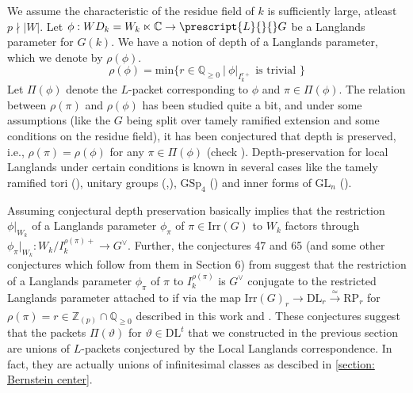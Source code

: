 \documentclass[11 pt]{article}
\numberwithin{equation}{subsection}
\theoremstyle{definition}
\theoremstyle{remark}
\theoremstyle{conjecture}
\newcommand{\Irr}{\mathrm{Irr}}
\newcommand{\DL}{\mathrm{DL}}
\newcommand{\RP}{\mathrm{RP}}
\newcommand{\GL}{\mathrm{GL}}
\newcommand{\Z}{\mathbb Z}
\newcommand{\Q}{\mathbb Q}
\newcommand{\C}{\mathbb C}
\begin{document}
We assume the characteristic of the residue field of $k$ is sufficiently large, atleast $p \nmid |W|$. Let $\phi: WD_k=W_k\ltimes\C\rightarrow \prescript{L}{}{}G$ be a Langlands parameter for $G(k)$. We have a notion of depth of a Langlands parameter, which we denote by $\rho(\phi)$. 
\begin{equation*}
    \rho(\phi)=\text{min}\{ r \in \Q_{\geq 0}\:|\: \phi|_{I_k^{r+}}\text{ is trivial }\}
\end{equation*}
Let $\Pi(\phi)$ denote the $L$-packet corresponding to $\phi$ and $\pi \in \Pi(\phi)$. The relation between $\rho(\pi)$ and $\rho(\phi)$ has been studied quite a bit, and under some assumptions (like the $G$ being split over tamely ramified extension and some conditions on the residue field), it has been conjectured that depth is preserved, i.e., $\rho(\pi)=\rho(\phi)$ for any $\pi \in \Pi(\phi)$ (check \cite[Conjecture 52]{chendebackertsai}). Depth-preservation for local Langlands under certain conditions is known in several cases like the tamely ramified tori (\cite[Section 7.10]{Yutori}), unitary groups (\cite{oi2023depthquasispliclassical},\cite{Oi2021Depthnon-quasi}), $\mathrm{GSp}_4$ (\cite{ganapathy2015GSP4}) and inner forms of $\GL_n$ (\cite{aubert2016depth}). \par

Assuming conjectural depth preservation basically implies that the restriction $\phi|_{W_k}$ of a Langlands parameter $\phi_\pi$ of $\pi \in \Irr(G)$ to $W_k$  factors through $\phi_\pi|_{W_k}: W_k/I_k^{\rho(\pi)+}\rightarrow G^\vee $. Further, the conjectures 47 and 65 (and some other conjectures which follow from them in Section 6) from \cite{chendebackertsai} suggest that the restriction of a Langlands parameter $\phi_\pi$ of $\pi $ to $I_k^{\rho(\pi)}$ is $G^\vee $ conjugate to the restricted Langlands parameter attached to if via the map $\Irr(G)_r \rightarrow \DL_r \xrightarrow[]{\simeq}\RP_r$ for $\rho(\pi)=r\in \Z_{(p)}\cap \Q_{\geq 0} $ described in this work and \cite{chendebackertsai}. These conjectures suggest that the packets $\Pi(\vartheta)$ for $\vartheta \in \DL^t$ that we constructed in the previous section are unions of $L$-packets conjectured by the Local Langlands correspondence. In fact, they are actually unions of infinitesimal classes as descibed in \ref{section: Bernstein center}. \par
\end{document}
